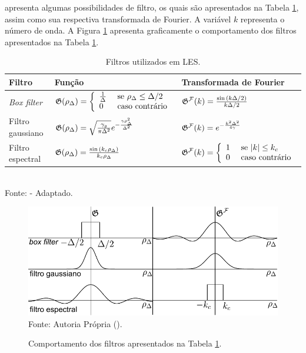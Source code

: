  apresenta algumas possibilidades de filtro, os quais são apresentados na Tabela \ref{tab:filters}, assim como sua respectiva transformada de Fourier. A variável $k$ representa o número de onda. A Figura \ref{fig:Filters} apresenta graficamente o comportamento dos filtros apresentados na Tabela \ref{tab:filters}.

\begin{table}[h!]
    \centering
    \caption{Filtros utilizados em LES.}
    \begin{tabular}{lll}
        \hline
        Filtro              & Função                                                                                                                                             & Transformada de Fourier                                                                                                  \\\hline
        \textit{Box filter} & $\mathfrak{G}(\rho_\Delta)=\left\{\begin{array}{ll}\frac{1}{\Delta} & \text{ se }\rho_\Delta\leq\Delta/2 \\0& \text{ caso contrário}\end{array}\right.$ & ${\mathfrak{G}}^{\mathcal{F}}(k)=\frac{\sin{(k\Delta/2)}}{k\Delta/2}$                                                               \\
        Filtro gaussiano    & $\mathfrak{G}(\rho_\Delta)=\sqrt{\frac{\gamma_g}{\pi\Delta^2}}e^{-\frac{\gamma\rho_\Delta^2}{\Delta^2}}$                                                & ${\mathfrak{G}}^{\mathcal{F}}(k)=e^{-\frac{k^2\Delta^2}{4\gamma}}$                                                                  \\
        Filtro espectral    & $\mathfrak{G}(\rho_\Delta)=\frac{\sin{(k_c\rho_\Delta)}}{k_c\rho_\Delta}$                                                                               & ${\mathfrak{G}}^{\mathcal{F}}(k)=\left\{\begin{array}{ll} 1 & \text{ se }|k|\leq k_c \\0& \text{ caso contrário}\end{array}\right.$ \\\hline
    \end{tabular}
    \\Fonte:  - Adaptado.
    \label{tab:filters}
\end{table}

\begin{figure}[h!]
    \centering
    \caption{Comportamento dos filtros apresentados na Tabela \ref{tab:filters}.}
    \includegraphics[width=.85\linewidth]{Figuras/filtros.pdf}
    \\Fonte: Autoria Própria (\the\year).
    \label{fig:Filters}
\end{figure}

